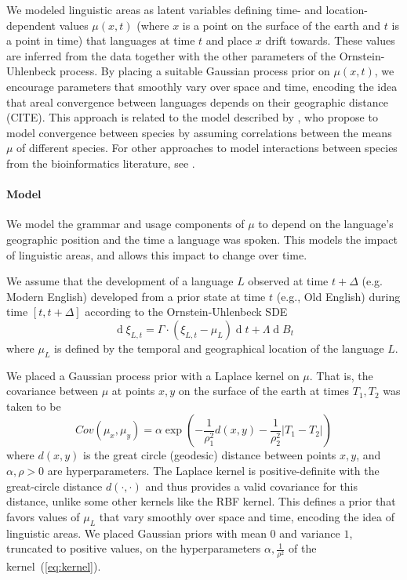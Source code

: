 \documentclass[11pt,a4paper]{article}
\begin{document}
We modeled linguistic areas as latent variables defining time- and location-dependent values $\mu(x,t)$ (where $x$ is a point on the surface of the earth and $t$ is a point in time) that languages at time $t$ and place $x$ drift towards.
These values are inferred from the data together with the other parameters of the Ornstein-Uhlenbeck process.
By placing a suitable Gaussian process prior on $\mu(x,t)$, we encourage parameters that smoothly vary over space and time, encoding the idea that areal convergence between languages depends on their geographic distance (CITE).
This approach is related to the model described by \citep{nuismer2015predicting}, who propose to model convergence between species by assuming correlations between the means $\mu$ of different species.
For other approaches to model interactions between species from the bioinformatics literature, see \citet{manceau2016a,drury2016estimating, bartoszek2017using, drury2018an}.


\paragraph{Model}
We model the grammar and usage components of $\mu$ to depend on the language's geographic position and the time a language was spoken.
This models the impact of linguistic areas, and allows this impact to change over time.

We assume that the development of a language $L$ observed at time $t+\Delta$ (e.g. Modern English) developed from a prior state at time $t$ (e.g., Old English) during time $[t, t+\Delta]$ according to the Ornstein-Uhlenbeck SDE
\begin{equation}
    \operatorname{d}\xi_{L,t} = \Gamma \cdot (\xi_{L,t}-\mu_L) \operatorname{d}t + \Lambda \operatorname{d}B_t
\end{equation}
where $\mu_L$ is defined by the temporal and geographical location of the language $L$.


We placed a Gaussian process prior with a Laplace kernel on $\mu$.
That is, the covariance between $\mu$ at points $x, y$ on the surface of the earth at times $T_1, T_2$ was taken to be
\begin{equation}\label{eq:kernel}
    Cov(\mu_x, \mu_y) = \alpha \exp\left(-\frac{1}{\rho^2_1} d(x,y) - \frac{1}{\rho_2^2} |T_1-T_2|\right)
\end{equation}
where $d(x,y)$ is the great circle (geodesic) distance between points $x, y$, and $\alpha, \rho>0$ are hyperparameters.
The Laplace kernel is positive-definite with the great-circle distance $d(\cdot, \cdot)$ \citep{feragen2015geodesic} and thus provides a valid covariance for this distance, unlike some other kernels like the RBF kernel.
This defines a prior that favors values of $\mu_L$ that vary smoothly over space and time, encoding the idea of linguistic areas.
We placed Gaussian priors with mean $0$ and variance $1$, truncated to positive values, on the hyperparameters $\alpha, \frac{1}{\rho^2}$ of the kernel~(\ref{eq:kernel}).
\end{document}
